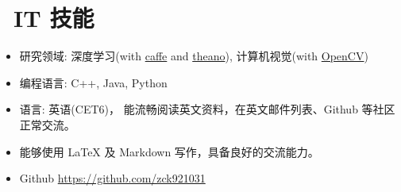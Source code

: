 \documentclass{resume}
\begin{document}

\section{\faCogs\ IT 技能}
\begin{itemize}[parsep=0.5ex]
  \item 研究领域: 深度学习(with \href{http://caffe.berkeleyvision.org/}{caffe} and \href{http://deeplearning.net/software/theano/}{theano}), 计算机视觉(with \href{http://opencv.org/}{OpenCV})
  \item 编程语言: C++, Java, Python
  \item 语言: 英语(CET6)， 能流畅阅读英文资料，在英文邮件列表、Github 等社区正常交流。
  \item 能够使用 LaTeX 及 Markdown 写作，具备良好的交流能力。
  \item \faGithub Github \href{https://github.com/zck921031}{https://github.com/zck921031}
\end{itemize}

%
%
\end{document}
